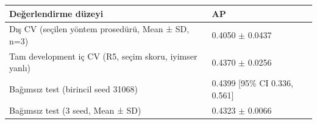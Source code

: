 \begin{tabular}{p{9.5cm}l}\toprule
Değerlendirme düzeyi & AP \\\midrule
Dış CV (seçilen yöntem prosedürü, Mean ± SD, n=3) & 0.4050 $\pm$ 0.0437 \\
Tam development iç CV (R5, seçim skoru, iyimser yanlı) & 0.4370 $\pm$ 0.0256 \\
Bağımsız test (birincil seed 31068) & 0.4399  [95\% CI 0.336, 0.561] \\
Bağımsız test (3 seed, Mean ± SD) & 0.4323 $\pm$ 0.0066 \\
\bottomrule\end{tabular}